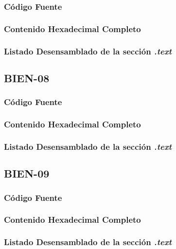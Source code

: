 \documentclass[a4paper,12pt]{article}
\begin{document}
\subsubsection{Código Fuente}

\subsubsection{Contenido Hexadecimal Completo}
\subsubsection{Listado Desensamblado de la sección \textit{.text}}


\subsection{BIEN-08}
\subsubsection{Código Fuente}

\subsubsection{Contenido Hexadecimal Completo}
\subsubsection{Listado Desensamblado de la sección \textit{.text}}


\subsection{BIEN-09}
\subsubsection{Código Fuente}

\subsubsection{Contenido Hexadecimal Completo}
\subsubsection{Listado Desensamblado de la sección \textit{.text}}
\end{document}
